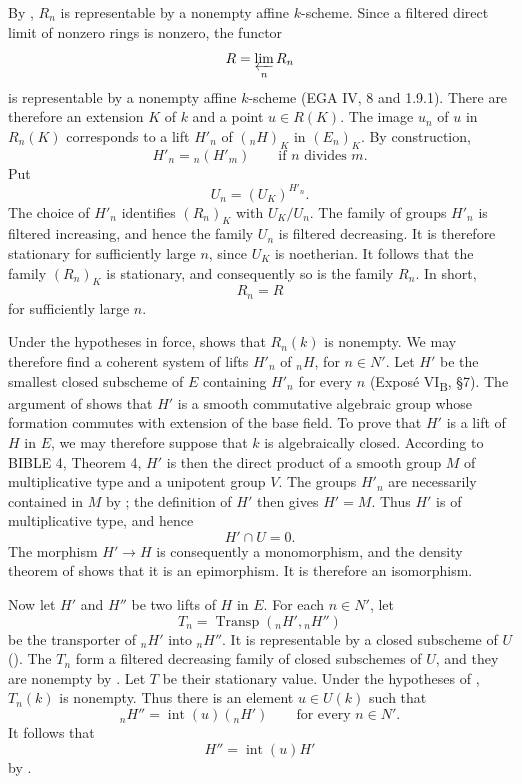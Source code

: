 
By , \(R_n\) is representable by a nonempty affine
\(k\)-scheme.  Since a filtered direct limit of nonzero rings is
nonzero, the functor
\[
  R=\varprojlim_n R_n
\]
is representable by a nonempty affine \(k\)-scheme
(EGA IV, 8 and 1.9.1).  There are therefore an extension \(K\) of
\(k\) and a point \(u\in R(K)\).  The image \(u_n\) of \(u\) in
\(R_n(K)\) corresponds to a lift \(H'_n\) of \(({}_nH)_K\) in
\((E_n)_K\).  By construction,
\[
  H'_n={}_n(H'_m)\qquad\text{if \(n\) divides \(m\)}.
\]
Put
\[
  U_n=(U_K)^{H'_n}.
\]
The choice of \(H'_n\) identifies \((R_n)_K\) with \(U_K/U_n\).
The family of groups \(H'_n\) is filtered increasing, and hence
the family \(U_n\) is filtered decreasing.  It is therefore
stationary for sufficiently large \(n\), since \(U_K\) is
noetherian.  It follows that the family \((R_n)_K\) is stationary,
and consequently so is the family \(R_n\).  In short,
\[
  R_n=R
\]
for sufficiently large \(n\).

Under the hypotheses in force,  shows that \(R_n(k)\) is
nonempty.  We may therefore find a coherent system of lifts
\(H'_n\) of \({}_nH\), for \(n\in N'\).  Let \(H'\) be the
smallest closed subscheme of \(E\) containing \(H'_n\) for every
\(n\) (Exposé VI\textsubscript{B}, \S7).  The argument of
 shows that \(H'\) is a smooth commutative
algebraic group whose formation commutes with extension of the
base field.  To prove that \(H'\) is a lift of \(H\) in \(E\), we
may therefore suppose that \(k\) is algebraically closed.
According to BIBLE 4, Theorem 4, \(H'\) is then the direct product
of a smooth group \(M\) of multiplicative type and a unipotent
group \(V\).  The groups \(H'_n\) are necessarily contained in
\(M\) by ; the definition of \(H'\) then gives \(H'=M\).
Thus \(H'\) is of multiplicative type, and hence
\[
  H'\cap U=0.
\]
The morphism \(H'\to H\) is consequently a monomorphism, and the
density theorem of  shows that it is an
epimorphism.  It is therefore an isomorphism.

Now let \(H'\) and \(H''\) be two lifts of \(H\) in \(E\).  For
each \(n\in N'\), let
\[
  T_n=\operatorname{Transp}({}_nH',{}_nH'')
\]
be the transporter of \({}_nH'\) into \({}_nH''\).  It is
representable by a closed subscheme of \(U\)
().  The \(T_n\) form a filtered decreasing
family of closed subschemes of \(U\), and they are nonempty by
.  Let \(T\) be their stationary value.  Under the
hypotheses of , \(T_n(k)\) is nonempty.  Thus there is an
element \(u\in U(k)\) such that
\[
  {}_nH''=\operatorname{int}(u)({}_nH')
  \qquad\text{for every \(n\in N'\)}.
\]
It follows that
\[
  H''=\operatorname{int}(u)H'
\]
by .

